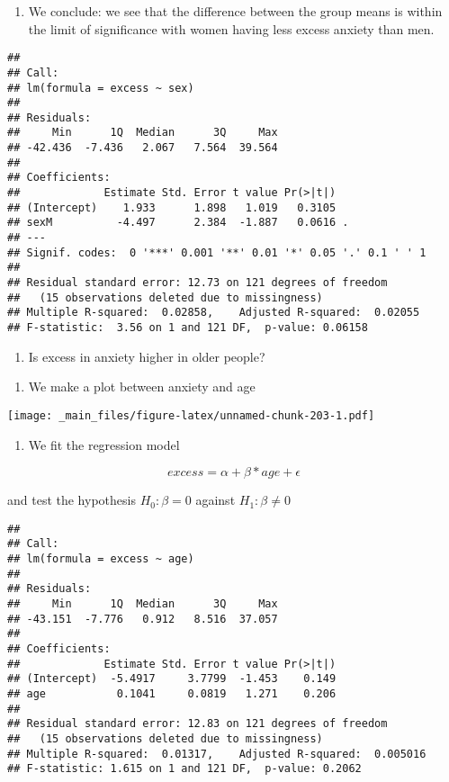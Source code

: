\documentclass[
]{book}
\providecommand{\tightlist}{%
  \setlength{\itemsep}{0pt}\setlength{\parskip}{0pt}}
\begin{document}
\begin{enumerate}
\def\labelenumi{\alph{enumi}.}
\setcounter{enumi}{1}
\tightlist
\item
  We conclude: we see that the difference between the group means is within the limit of significance with women having less excess anxiety than men.
\end{enumerate}

\begin{verbatim}
## 
## Call:
## lm(formula = excess ~ sex)
## 
## Residuals:
##     Min      1Q  Median      3Q     Max 
## -42.436  -7.436   2.067   7.564  39.564 
## 
## Coefficients:
##             Estimate Std. Error t value Pr(>|t|)  
## (Intercept)    1.933      1.898   1.019   0.3105  
## sexM          -4.497      2.384  -1.887   0.0616 .
## ---
## Signif. codes:  0 '***' 0.001 '**' 0.01 '*' 0.05 '.' 0.1 ' ' 1
## 
## Residual standard error: 12.73 on 121 degrees of freedom
##   (15 observations deleted due to missingness)
## Multiple R-squared:  0.02858,    Adjusted R-squared:  0.02055 
## F-statistic:  3.56 on 1 and 121 DF,  p-value: 0.06158
\end{verbatim}

\begin{enumerate}
\def\labelenumi{\arabic{enumi}.}
\setcounter{enumi}{3}
\tightlist
\item
  Is excess in anxiety higher in older people?
\end{enumerate}

\begin{enumerate}
\def\labelenumi{\alph{enumi}.}
\tightlist
\item
  We make a plot between anxiety and age
\end{enumerate}

\texttt{[image: \_main\_files/figure-latex/unnamed-chunk-203-1.pdf]}

\begin{enumerate}
\def\labelenumi{\alph{enumi}.}
\setcounter{enumi}{1}
\tightlist
\item
  We fit the regression model
\end{enumerate}

\[excess = \alpha + \beta * age + \epsilon\]

and test the hypothesis \(H_0: \beta=0\) against \(H_1: \beta\neq 0\)

\begin{verbatim}
## 
## Call:
## lm(formula = excess ~ age)
## 
## Residuals:
##     Min      1Q  Median      3Q     Max 
## -43.151  -7.776   0.912   8.516  37.057 
## 
## Coefficients:
##             Estimate Std. Error t value Pr(>|t|)
## (Intercept)  -5.4917     3.7799  -1.453    0.149
## age           0.1041     0.0819   1.271    0.206
## 
## Residual standard error: 12.83 on 121 degrees of freedom
##   (15 observations deleted due to missingness)
## Multiple R-squared:  0.01317,    Adjusted R-squared:  0.005016 
## F-statistic: 1.615 on 1 and 121 DF,  p-value: 0.2062
\end{verbatim}
\end{document}
